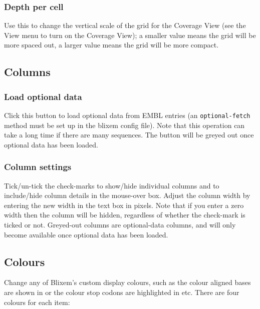 \documentclass[letterpaper]{article}
\begin{document}
\bigskip

{\color[rgb]{0.30980393,0.5058824,0.7411765}\subsubsection[Depth per cell]{Depth per cell}}
\hypertarget{RefHeading334716266717}{}
Use this to change the vertical scale of the grid for the Coverage View (see the View menu to turn on the Coverage View); a smaller value means the grid will be more spaced out, a larger value means the grid will be more compact.

\bigskip

{\color[rgb]{0.30980393,0.5058824,0.7411765}\subsection[Columns]{Columns}}
\hypertarget{RefHeading2481056909880}{}
{\color[rgb]{0.30980393,0.5058824,0.7411765}\subsubsection[Load optional data]{Load optional data }}
\hypertarget{RefHeading2501056909880}{}
Click this button to load optional data from EMBL entries (an \texttt{optional-fetch} method must be set up in the blixem config file). Note that this operation can take a long time if there are many sequences. The button will be greyed out once optional data has been loaded.

\bigskip

{\color[rgb]{0.30980393,0.5058824,0.7411765}\subsubsection[Column settings]{Column settings}}
\hypertarget{RefHeading2521056909880}{}
Tick/un-tick the check-marks to show/hide individual columns and to include/hide column details in the mouse-over box. Adjust the column width by entering the new width in the text box in pixels. Note that if you enter a zero width then the column will be hidden, regardless of whether the check-mark is ticked or not. Greyed-out columns are optional-data columns, and will only become available once optional data has been loaded.

\bigskip

{\color[rgb]{0.30980393,0.5058824,0.7411765}\subsection[Appearance]{Colours}}
\hypertarget{RefHeading2621056909880}{}
Change any of Blixem{\textquoteright}s custom display colours, such as the colour aligned bases are shown in or the colour stop codons are highlighted in etc. There are four colours for each item:
\end{document}
